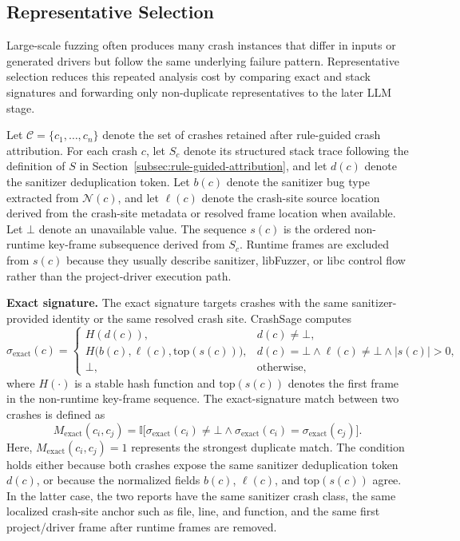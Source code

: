 \documentclass[pdflatex,sn-basic]{sn-jnl}%
\theoremstyle{thmstyleone}%
\theoremstyle{thmstyletwo}%
\theoremstyle{thmstylethree}%
\begin{document}
\subsection{Representative Selection}

Large-scale fuzzing often produces many crash instances that differ in inputs or generated drivers but follow the same underlying failure pattern.
Representative selection reduces this repeated analysis cost by comparing exact and stack signatures and forwarding only non-duplicate representatives to the later LLM stage.

Let \(\mathcal{C}=\{c_1,\ldots,c_n\}\) denote the set of crashes retained after rule-guided crash attribution.
For each crash \(c\), let \(S_c\) denote its structured stack trace following the definition of \(S\) in Section~\ref{subsec:rule-guided-attribution}, and let \(d(c)\) denote the sanitizer deduplication token.
Let \(b(c)\) denote the sanitizer bug type extracted from \(\mathcal{N}(c)\), and let \(\ell(c)\) denote the crash-site source location derived from the crash-site metadata or resolved frame location when available.
Let \(\bot\) denote an unavailable value.
The sequence \(s(c)\) is the ordered non-runtime key-frame subsequence derived from \(S_c\).
Runtime frames are excluded from \(s(c)\) because they usually describe sanitizer, libFuzzer, or libc control flow rather than the project-driver execution path.

\textbf{Exact signature.} The exact signature targets crashes with the same sanitizer-provided identity or the same resolved crash site.
CrashSage computes
\begin{equation*}
\sigma_{\mathrm{exact}}(c)=
\begin{cases}
H(d(c)), & d(c)\neq \bot,\\
H\bigl(b(c),\ell(c),\mathrm{top}(s(c))\bigr), & d(c)=\bot \land \ell(c)\neq \bot \land |s(c)|>0,\\
\bot, & \text{otherwise},
\end{cases}
\end{equation*}
where \(H(\cdot)\) is a stable hash function and \(\mathrm{top}(s(c))\) denotes the first frame in the non-runtime key-frame sequence.
The exact-signature match between two crashes is defined as
\begin{equation*}
M_{\mathrm{exact}}(c_i,c_j)=
\mathbb{I}\bigl[
\sigma_{\mathrm{exact}}(c_i)\neq \bot
\land \sigma_{\mathrm{exact}}(c_i)=\sigma_{\mathrm{exact}}(c_j)
\bigr].
\end{equation*}
Here, \(M_{\mathrm{exact}}(c_i,c_j)=1\) represents the strongest duplicate match.
The condition holds either because both crashes expose the same sanitizer deduplication token \(d(c)\), or because the normalized fields \(b(c)\), \(\ell(c)\), and \(\mathrm{top}(s(c))\) agree.
In the latter case, the two reports have the same sanitizer crash class, the same localized crash-site anchor such as file, line, and function, and the same first project/driver frame after runtime frames are removed.
\end{document}
